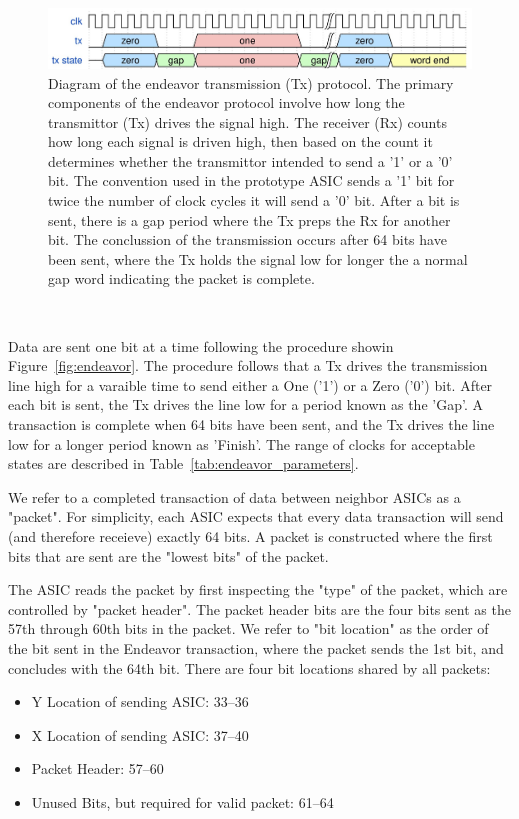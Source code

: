 \begin{figure}[]
\centering
\includegraphics[width=\textwidth]{images/endeavor_protocol.jpg}
\caption{Diagram of the endeavor transmission (Tx) protocol.
The primary components of the endeavor protocol involve how long the transmittor (Tx) drives the signal high.
The receiver (Rx) counts how long each signal is driven high, then based on the count it determines whether the transmittor intended to send a '1' or a '0' bit.
The convention used in the prototype ASIC sends a '1' bit for twice the number of clock cycles it will send a '0' bit.
After a bit is sent, there is a gap period where the Tx preps the Rx for another bit.
The conclussion of the transmission occurs after 64 bits have been sent, where the Tx holds the signal low for longer the a normal gap word indicating the packet is complete.
}
\end{figure}~\label{fig:endeavor}

Data are sent one bit at a time following the procedure showin Figure~\ref{fig:endeavor}. 
The procedure follows that a Tx drives the transmission line high for a varaible time to send either a One ('1') or a Zero ('0') bit.
After each bit is sent, the Tx drives the line low for a period known as the 'Gap'.
A transaction is complete when 64 bits have been sent, and the Tx drives the line low for a longer period known as 'Finish'.
The range of clocks for acceptable states are described in Table~\ref{tab:endeavor_parameters}.

We refer to a completed transaction of data between neighbor ASICs as a "packet".
For simplicity, each ASIC expects that every data transaction will send (and therefore receieve) exactly 64 bits.
A packet is constructed where the first bits that are sent are the "lowest bits" of the packet.

The ASIC reads the packet by first inspecting the "type" of the packet, which are controlled by "packet header".
The packet header bits are the four bits sent as the 57th through 60th bits in the packet.
We refer to "bit location" as the order of the bit sent in the Endeavor transaction, where the packet sends the 1st bit, and concludes with the 64th bit.
There are four bit locations shared by all packets:

\begin{itemize}
    \item Y Location of sending ASIC: 33--36
    \item X Location of sending ASIC: 37--40
    \item Packet Header: 57--60
    \item Unused Bits, but required for valid packet: 61--64
\end{itemize}~\label{bit_reservation}

